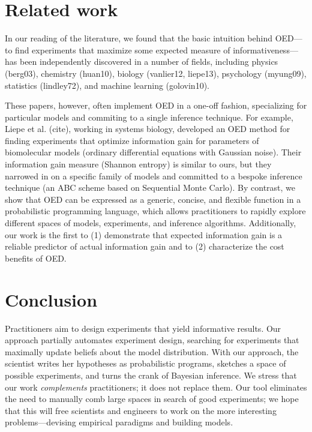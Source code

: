 \documentclass{article}
\begin{document}

\section{Related work}

In our reading of the literature, we found that the basic intuition behind OED---to find experiments that maximize some expected measure of informativeness---has been independently discovered in a number of fields, including physics (berg03), chemistry (huan10), biology (vanlier12, liepe13), psychology (myung09), statistics (lindley72), and machine learning (golovin10).

These papers, however, often implement OED in a one-off fashion, specializing for  particular models and commiting to a single inference technique.
For example, Liepe et al. (cite), working in systems biology, developed an OED method for finding experiments that optimize information gain for parameters of biomolecular models (ordinary differential equations with Gaussian noise).
Their information gain measure (Shannon entropy) is similar to ours, but they narrowed in on a specific family of models and committed to a bespoke inference technique (an ABC scheme based on Sequential Monte Carlo).
By contrast, we show that OED can be expressed as a generic, concise, and flexible function in a probabilistic programming language, which allows practitioners to rapidly explore different spaces of models, experiments, and inference algorithms.
Additionally, our work is the first to (1) demonstrate that expected information gain is a reliable predictor of actual information gain and to (2) characterize the cost benefits of OED.

\section{Conclusion}

Practitioners aim to design experiments that yield informative results.
Our approach partially automates experiment design, searching for experiments that maximally update beliefs about the model distribution.
With our approach, the scientist writes her hypotheses as probabilistic programs, sketches a space of possible experiments, and turns the crank of Bayesian inference.
We stress that our work \emph{complements} practitioners; it does not replace them.
Our tool eliminates the need to manually comb large spaces in search of good experiments; we hope that this will free scientists and engineers to work on the more interesting problems---devising empirical paradigms and building models.
\end{document}
